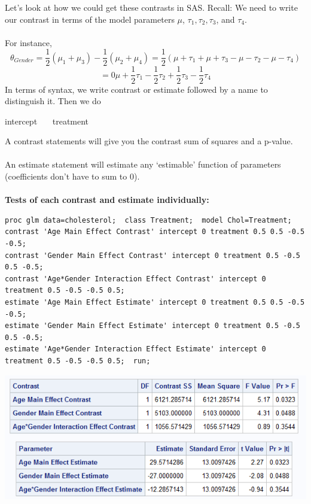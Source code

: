 \newpage

Let's look at how we could get these contrasts in SAS.  Recall:  We need to write our contrast in terms of the model parameters $\mu$, $\tau_1, \tau_2,\tau_3$, and $\tau_4$. \\~\\
For instance, 
$$\theta_{Gender}=\frac{1}{2}(\mu_1+\mu_3)-\frac{1}{2}(\mu_2+\mu_4)=\frac{1}{2}(\mu+\tau_1+\mu+\tau_3-\mu-\tau_2-\mu-\tau_4)$$
$$=0\mu+\frac{1}{2}\tau_1-\frac{1}{2}\tau_2+\frac{1}{2}\tau_3-\frac{1}{2}\tau_4$$
In terms of syntax, we write contrast or estimate followed by a name to distinguish it.  Then we do
\begin{center}
intercept ~~~treatment ~~~~~~
\end{center}
A contrast statements will give you the contrast sum of squares and a p-value.\\~\\
An estimate statement will estimate any `estimable' function of parameters (coefficients don't have to sum to 0). \\~\\

\textbf{Tests of each contrast and estimate individually:}
\begin{small}
\begin{verbatim}
proc glm data=cholesterol;  class Treatment;  model Chol=Treatment;
contrast 'Age Main Effect Contrast' intercept 0 treatment 0.5 0.5 -0.5 -0.5;
contrast 'Gender Main Effect Contrast' intercept 0 treatment 0.5 -0.5 0.5 -0.5;
contrast 'Age*Gender Interaction Effect Contrast' intercept 0 treatment 0.5 -0.5 -0.5 0.5;
estimate 'Age Main Effect Estimate' intercept 0 treatment 0.5 0.5 -0.5 -0.5;
estimate 'Gender Main Effect Estimate' intercept 0 treatment 0.5 -0.5 0.5 -0.5;
estimate 'Age*Gender Interaction Effect Estimate' intercept 0 treatment 0.5 -0.5 -0.5 0.5;  run;
\end{verbatim}
\end{small}

\begin{flushleft}
\includegraphics[scale=0.75]{CholContrasts}
\end{flushleft}

